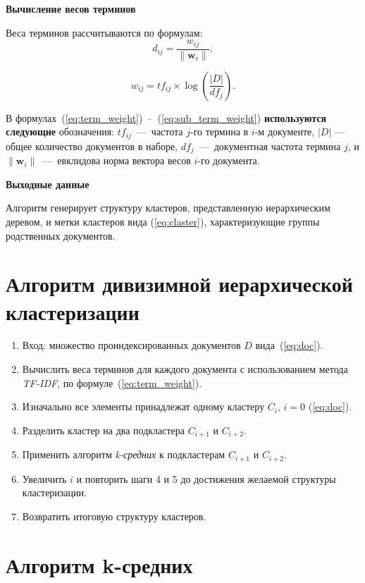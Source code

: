 \textbf{Вычисление весов терминов}

Веса терминов рассчитываются по формулам:
\begin{equation}\label{eq:term_weight}
d_{ij} = \frac{w_{ij}}{\|\mathbf{w}_i\|}, 
\end{equation}

\begin{equation}\label{eq:sub_term_weight}
w_{ij} = tf_{ij} \times \log\left(\frac{|D|}{df_j}\right).
\end{equation} 

В формулах~(\ref{eq:term_weight})~--~(\ref{eq:sub_term_weight}) \textbf{используются следующие} обозначения: \( tf_{ij} \)~---~частота \( j \)-го термина в \( i \)-м документе, \( |D| \) --- общее количество документов в наборе, \( df_j \)~---~документная частота термина \( j \), и \( \|\mathbf{w}_i\| \)~---~евклидова норма вектора весов \( i \)-го документа.

\textbf{Выходные данные}

Алгоритм генерирует структуру кластеров, представленную иерархическим деревом, и метки кластеров вида (\ref{eq:claster}), характеризующие группы родственных документов.

\section {Алгоритм дивизимной иерархической кластеризации}

\begin{enumerate}
	\item Вход: множество проиндексированных документов $D$ вида~(\ref{eq:doc}).
	\item Вычислить веса терминов для каждого документа с использованием метода \textit{TF-IDF}, по формуле~(\ref{eq:term_weight}).
	\item Изначально все элементы принадлежат одному кластеру $C_i$, $i = 0$ (\ref{eq:doc}).
	\item Разделить кластер на два подкластера $C_{i+1}$ и $C_{i+2}$.
	\item Применить алгоритм \textit{k-средних} к подкластерам $C_{i+1}$ и $C_{i+2}$. 
	\item Увеличить $i$ и повторить шаги 4 и 5 до достижения желаемой структуры кластеризации.
	\item Возвратить итоговую структуру кластеров.
\end{enumerate}


\section{Алгоритм k-средних}


